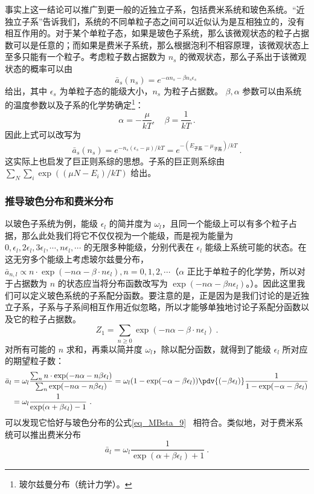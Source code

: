 事实上这一结论可以推广到更一般的近独立子系，包括费米系统和玻色系统。“近独立子系”告诉我们，系统的不同单粒子态之间可以近似认为是互相独立的，没有相互作用的。对于某个单粒子态，如果是玻色子系统，那么该微观状态的粒子占据数可以是任意的；而如果是费米子系统，那么根据泡利不相容原理，该微观状态上至多只能有一个粒子。考虑粒子数占据数为 $n_s$ 的微观状态，那么子系出于该微观状态的概率可以由 
\begin{equation}
\bar a_s(n_s) =  e^{-\alpha n_s-\beta n_s \epsilon_s}~
\end{equation}
给出，其中 $\epsilon_s$ 为单粒子态的能级大小，$n_s$ 为粒子占据数。
$\beta,\alpha$ 参数可以由系统的温度参数以及子系的化学势确定\footnote{玻尔兹曼分布（统计力学）。}：
\begin{equation}
\alpha=-\frac{\mu}{kT},\quad \beta=\frac{1}{kT}~.
\end{equation}
因此上式可以改写为
\begin{equation}
\bar a_s(n_s)= e^{-n_s(\epsilon_s-\mu)/kT}= e^{-(E_\text{子系}-\mu_\text{子系})/kT}~.
\end{equation}
这实际上也启发了巨正则系综的思想。子系的巨正则系综由 $\sum_N \sum_i \exp((\mu N-E_i)/kT)$ 给出。

\subsubsection{推导玻色分布和费米分布}
以玻色子系统为例，能级 $\epsilon_l$ 的简并度为 $\omega_l$，且同一个能级上可以有多个粒子占据，那么此处我们将它不仅仅视为一个能级，而是视为能量为 $0,\epsilon_l,2\epsilon_l,3\epsilon_l,\cdots, n\epsilon_l,\cdots$ 的无限多种能级，分别代表在 $\epsilon_l$ 能级上系统可能的状态。在这无穷多个能级上考虑玻尔兹曼分布，$\bar{a}_{n,l} \propto n\cdot \exp(-n\alpha-\beta\cdot n\epsilon_l),n=0,1,2,\cdots $（$\alpha$ 正比于单粒子的化学势，所以对于占据数为 $n$ 的状态应当将分布函数改写为 $\exp(-n\alpha-\beta n\epsilon_l)$。）。因此这里我们可以定义玻色系统的子系配分函数。要注意的是，正是因为是我们讨论的是近独立子系，子系与子系间相互作用近似忽略，所以才能够单独地讨论子系配分函数以及它的粒子占据数。
\begin{equation}
Z_1=\sum_{n\ge 0} \exp(-n\alpha-\beta\cdot n\epsilon_l)~.
\end{equation}
对所有可能的 $n$ 求和，再乘以简并度 $\omega_l$，除以配分函数，就得到了能级 $\epsilon_l$ 所对应的期望粒子数：
\begin{equation}
\begin{aligned}
\bar a_l&=\omega_l \frac{\sum_n n\cdot \exp(-n\alpha-n\beta\epsilon_l)}{\sum_n \exp(-n\alpha-n\beta\epsilon_l)}=\omega_l (1-\exp(-\alpha-\beta\epsilon_l)) \pdv{(-\beta\epsilon_l)} \frac{1}{1-\exp(-\alpha-\beta\epsilon_l)}\\
&=\omega_l \frac{1}{\exp(\alpha+\beta\epsilon_l)-1}~.
\end{aligned}
\end{equation}
可以发现它恰好与玻色分布的公式\autoref{eq_MBsta_9}~ 相符合。类似地，对于费米系统可以推出费米分布
\begin{equation}
\bar a_l=\omega_l \frac{1}{\exp(\alpha+\beta\epsilon_l)+1}~.
\end{equation}
